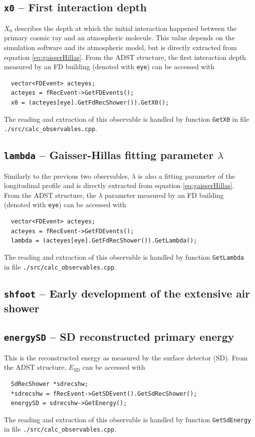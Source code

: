 \documentclass[12pt,a4paper]{report}
\begin{document}
\subsection{\texttt{x0} -- First interaction depth}
$X_0$ describes the depth at which the initial interaction happened between the primary cosmic ray and an atmospheric molecule. This value depends on the simulation software and its atmospheric model, but is directly extracted from equation \eqref{eq:gaisserHillas}. From the ADST structure, the first interaction depth measured by an FD building (denoted with \texttt{eye}) can be accessed with
\begin{verbatim}
  vector<FDEvent> acteyes;
  acteyes = fRecEvent->GetFDEvents();
  x0 = (acteyes[eye].GetFdRecShower()).GetX0();
\end{verbatim}
The reading and extraction of this observable is handled by function \texttt{GetX0} in file \texttt{./src/calc\_observables.cpp}.

\subsection{\texttt{lambda} -- Gaisser-Hillas fitting parameter $\lambda$}
Similarly to the previous two observables, $\lambda$ is also a fitting parameter of the longitudinal profile and is directly extracted from equation \eqref{eq:gaisserHillas}. From the ADST structure, the $\lambda$ parameter measured by an FD building (denoted with \texttt{eye}) can be accessed with
\begin{verbatim}
  vector<FDEvent> acteyes;
  acteyes = fRecEvent->GetFDEvents();
  lambda = (acteyes[eye].GetFdRecShower()).GetLambda();
\end{verbatim}
The reading and extraction of this observable is handled by function \texttt{GetLambda} in file \texttt{./src/calc\_observables.cpp}.

\subsection{\texttt{shfoot} -- Early development of the extensive air shower}
\subsection{\texttt{energySD} -- SD reconstructed primary energy}
This is the reconstructed energy as measured by the surface detector (SD). From the ADST structure, $E_{\textrm{SD}}$ can be accessed with
\begin{verbatim}
  SdRecShower *sdrecshw;
  *sdrecshw = fRecEvent->GetSDEvent().GetSdRecShower();
  energySD = sdrecshw->GetEnergy();
\end{verbatim}
The reading and extraction of this observable is handled by function \texttt{GetSdEnergy} in file \texttt{./src/calc\_observables.cpp}.
\end{document}
